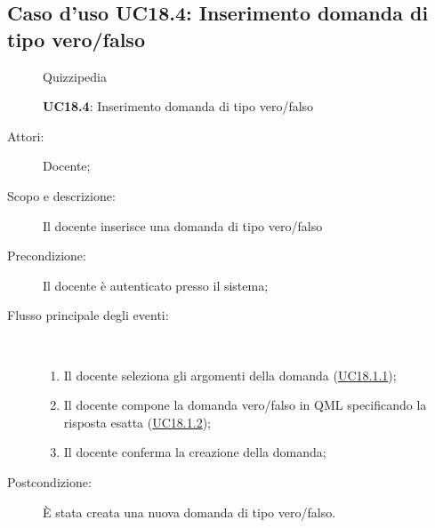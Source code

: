 \subsection{Caso d'uso UC18.4: Inserimento domanda di tipo vero/falso}
	\begin{figure}[H]
		\centering
		\begin{resizedtikzpicture}{\textwidth}
		\begin{umlsystem}[x=0, fill=lightgray!20]{Quizzipedia}
		\end{umlsystem}
		\end{resizedtikzpicture}
		\caption{\textbf{UC18.4}: Inserimento domanda di tipo vero/falso}
		\label{UC18.4}
	\end{figure}
\begin{description}
\item[Attori:] Docente;
\item[Scopo e descrizione:] Il docente inserisce una domanda di tipo vero/falso
      \item[Precondizione:] Il docente è autenticato presso il sistema;

        \item[Flusso principale degli eventi:] \ 
 \begin{enumerate}
          \item Il docente seleziona gli argomenti della domanda (\hyperlink{UC18.1.1}{UC18.1.1});
          \item Il docente compone la domanda vero/falso in QML specificando la risposta esatta (\hyperlink{UC18.1.2}{UC18.1.2});
          \item Il docente conferma la creazione della domanda;

      \end{enumerate}
    \item[Postcondizione:] È stata creata una nuova domanda di tipo vero/falso.
  \end{description}
\hypertarget{UC18.5}{}
